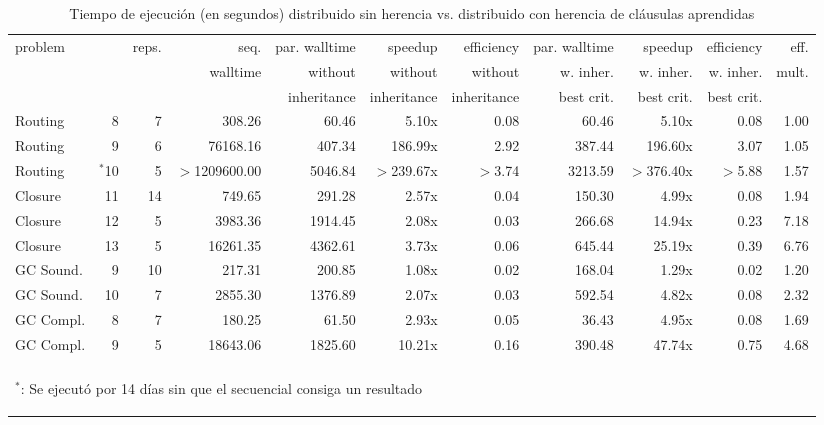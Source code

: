 \begin{table}
	\small
	\begin{tabular}{lrrrrrrrrrr}
		\toprule
		problem	&			&	reps.	& 	seq.		&  par. walltime	&	speedup				&	efficiency			& par.	walltime				& speedup 							& efficiency			& eff. \\
				&			&	 		& walltime		&  without 			&	without				&	without				& w. inher.	& w. inher. 	& w. inher.	& mult. \\
				&			&	 		& 				& inheritance 		&	 inheritance		&	 inheritance	 	& best crit.	& best crit. 	& best crit.	&  \\
		\cmidrule(r){1-11}
		Routing	&	8		&		7 	& 308.26		&  60.46		& 5.10x		&	0.08 		& 60.46			&	5.10x	& 0.08		& 1.00 \\
		Routing	&	9		&	6 		& 76168.16		&  407.34		& 	186.99x	&	2.92 		& 387.44		& 196.60x	& 3.07		& 1.05 \\
		Routing	&	$^*$10	&	5 		& $>$1209600.00	&  5046.84		&$>$239.67x	&	$>$3.74 	& 3213.59		&$>$376.40x	& $>$5.88	& 1.57 \\
		\cmidrule(r){1-11}
		Closure	&	11		&	14 		& 749.65		&  291.28		&	2.57x	&	0.04 		& 150.30		&  4.99x	& 0.08		& 1.94 \\
		Closure	&	12		&	5 		& 3983.36		&  1914.45		&	2.08x	&	0.03 		& 266.68		& 14.94x	& 0.23		& 7.18 \\
		Closure	&	13		&  5 		& 16261.35		& 	4362.61		&	3.73x	&	0.06 		& 645.44		& 25.19x	& 0.39		& 6.76 \\
		\cmidrule(r){1-11}
		GC Sound.&	9		&	10 		& 217.31		&  200.85		&	1.08x	&	0.02 		& 168.04		& 1.29x		& 0.02		& 1.20 \\
		GC Sound.&	10		&	7 		&  2855.30		&  1376.89		&	2.07x	&	0.03 		& 592.54		& 4.82x		& 0.08		& 2.32 \\
		\cmidrule(r){1-11}
		GC Compl.	& 8		&	7 		& 180.25		&  61.50		&	2.93x	&	0.05 		& 36.43			& 4.95x		& 0.08		& 1.69 \\
		GC Compl.	& 9	&	5 		& 18643.06		&  1825.60		&	10.21x	&	0.16 		& 390.48		& 47.74x	& 0.75		& 4.68 \\
		\bottomrule
		\\
		\multicolumn{10}{l}{\begin{tiny}$^*$: Se ejecutó por 14 días sin que el \ssolver secuencial consiga un resultado\end{tiny}}
	\end{tabular}
	\caption{Tiempo de ejecución (en segundos) distribuido sin herencia vs. distribuido con herencia de cláusulas aprendidas}
	\label{tab:mejorlearning}
\end{table}

